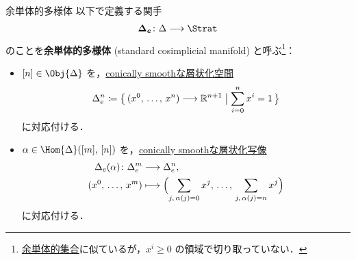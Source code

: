 \documentclass[TQFT_main]{subfiles}
\begin{document}
\begin{mydef}[label=def:standard-cosimplicial-mfd]{余単体的多様体}
    以下で定義する関手
    \begin{align}
        \bm{\Delta_e} \colon \Delta \lto \Strat
    \end{align}
    のことを\textbf{余単体的多様体} (standard cosimplicial manifold) と呼ぶ\footnote{\hyperref[def:simplicial-to]{余単体的集合}に似ているが，$x^i \ge 0$ の領域で切り取っていない．}：
    \begin{itemize}
        \item $[n] \in \Obj{\Delta}$ を，\hyperref[def:c-smooth]{conically smoothな層状化空間}
        \begin{align}
            \Delta_e^n \coloneqq \bigl\{\, (x^0,\, \dots,\, x^n) \longrightarrow \mathbb{R}^{n+1} \bigm| \sum_{i=0}^n x^i = 1 \,\bigr\} 
        \end{align}
        に対応付ける．
        \item $\alpha \in \Hom{\Delta}([m],\, [n])$ を，\hyperref[def:c-smooth-map]{conically smoothな層状化写像}
        \begin{align}
            \Delta_e(\alpha) \colon \Delta_e^m &\longrightarrow \Delta_e^n, \\
            (x^0,\, \dots,\, x^m) &\longmapsto \Bigl( \sum_{j,\, \alpha(j) = 0} x^j,\, \dots,\, \sum_{j,\, \alpha(j) = n} x^j \Bigr)
        \end{align}
        に対応付ける．
    \end{itemize}
\end{mydef}
\end{document}
